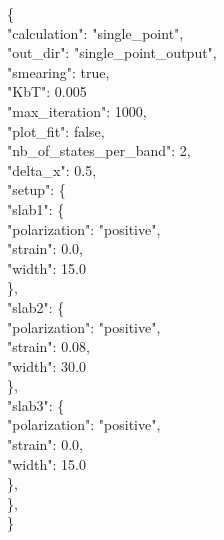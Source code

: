 \documentclass[a4paper,12pt]{article}
\begin{document}
\begin{tabbing}
\{ \ \= \\
          \>"calculation": "single\_point", \\
           \>"out\_dir": "single\_point\_output", \\
           \>"smearing": true, \\
           \>"KbT": 0.005\\
           \>"max\_iteration": 1000, \\
          \>"plot\_fit": false, \\
         \> "nb\_of\_states\_per\_band": 2, \\
          \>"delta\_x": 0.5, \\
          \>"setup": \{ \= \\
                   \>\> "slab1": \{ \= \\
                             \>\>\> "polarization": "positive", \\
                               \>\>\>"strain": 0.0, \\
                               \>\>\>"width": 15.0\\
                    \>\>\}, \\
                    \>\>"slab2": \{\= \\
                               \>\>\>"polarization": "positive",\\ 
                               \>\>\>"strain": 0.08, \\
                               \>\>\>"width": 30.0\\
                    \>\>\},\\
                    \>\>"slab3": \{\= \\
                               \>\>\>"polarization": "positive",\\ 
                              \>\>\> "strain": 0.0, \\
                               \>\>\>"width": 15.0\\
                    \>\>\}, \\

          \>\}, \\


\}\\
\end{tabbing}
\end{document}
